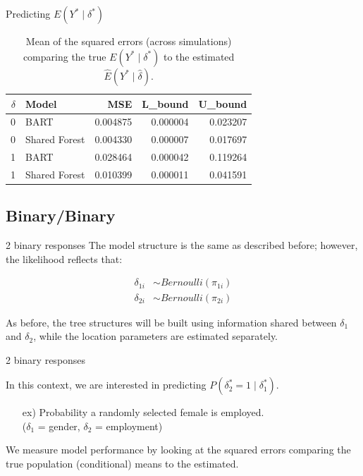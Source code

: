 \documentclass{beamer}
\begin{document}
\begin{frame}{Predicting $E(Y^* \mid \delta^*)$ }

\begin{table}[ht]
\centering
\begin{tabular}{rlrrr}
  \hline
$\delta$ & Model & MSE & L\_bound & U\_bound \\ 
  \hline
0 & BART & 0.004875 & 0.000004 & 0.023207 \\ 
  0 & Shared Forest & 0.004330 & 0.000007 & 0.017697 \\ 
  1 & BART & 0.028464 & 0.000042 & 0.119264 \\ 
  1 & Shared Forest & 0.010399 & 0.000011 & 0.041591 \\ 
   \hline
\end{tabular}
\caption{\label{tab:mse} Mean of the squared errors (across simulations) comparing the true $E(Y^* \mid \delta^*)$ to the estimated $\hat{E}(Y^* \mid \hat{\delta})$.}
\end{table}

\end{frame}

\subsection{Binary/Binary} 

\begin{frame}{2 binary responses}
The model structure is the same as described before; however, the likelihood reflects that:

\begin{align}
\delta_{1i} &\sim Bernoulli(\pi_{1i}) \\
\delta_{2i} &\sim Bernoulli(\pi_{2i})
\end{align}

As before, the tree structures will be built using information shared between $\delta_1$ and $\delta_2$, while the location parameters are estimated separately. 

\end{frame}


\begin{frame}{2 binary responses}

In this context, we are interested in predicting $P(\delta^*_2=1 \mid \delta^*_1)$.
\begin{itemize}
\item[ex)] Probability a randomly selected female is employed. \\($\delta_1$ = gender, $\delta_2$ = employment)
\end{itemize}
We measure model performance by looking at the squared errors comparing the true population (conditional) means to the estimated. 

\end{frame}
\end{document}
